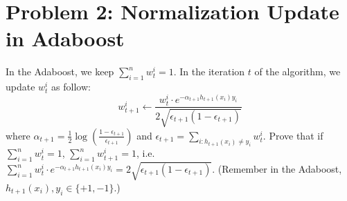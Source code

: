\documentclass{article}
\begin{document}
	\section*{Problem 2: Normalization Update in Adaboost}
	In the Adaboost, we keep $\sum_{i=1}^n w^i_t = 1$. In the iteration $t$ of the algorithm, we update $w_t^i$ as follow: 
	$$w^i _{t+1}\leftarrow \frac{w^i_t\cdot e^{-\alpha_{t+1} h_{t+1}(x_i)y_i}}{2\sqrt{\epsilon_{t+1}(1-\epsilon_{t+1})}}$$
	where $\alpha_{t+1} = \frac{1}{2}\log \left(\frac{1 - \epsilon_{t+1}}{\epsilon_{t+1}}\right)$ and  $\epsilon_{t+1} = \sum_{i:h_{t+1}(x_i)\neq y_i}w^i_t$. Prove that if $\sum_{i=1}^n w^i_t = 1$, $\sum_{i=1}^n w^i_{t+1} = 1$, i.e. $\sum_{i=1}^{n} w^i_t \cdot e^{-\alpha_{t+1} h_{t+1}(x_i)y_i} = 2\sqrt{\epsilon_{t+1} (1-\epsilon_{t+1})}$. (Remember in the Adaboost, $h_{t+1}(x_i),y_i\in \{+1, -1\}$.)
	
\end{document}
